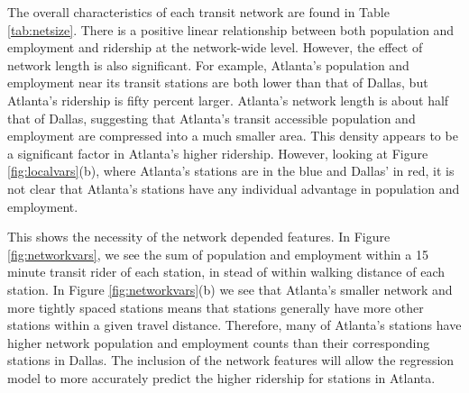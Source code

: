 \documentclass[11pt]{article}
\begin{document}
The overall characteristics of each transit network are found in Table \ref{tab:netsize}. There is a positive linear relationship between both population and employment and ridership at the network-wide level. However, the effect of network length is also significant. For example, Atlanta's population and employment near its transit stations are both lower than that of Dallas, but Atlanta's ridership is fifty percent larger. Atlanta's network length is about half that of Dallas, suggesting that Atlanta's transit accessible population and employment are compressed into a much smaller area. This density appears to be a significant factor in Atlanta's higher ridership. However, looking at Figure \ref{fig:localvars}(b), where Atlanta's stations are in the blue and Dallas' in red, it is not clear that Atlanta's stations have any individual advantage in population and employment. 

This shows the necessity of the network depended features. In Figure \ref{fig:networkvars}, we see the sum of population and employment within a 15 minute transit rider of each station, in stead of within walking distance of each station. In Figure \ref{fig:networkvars}(b) we see that Atlanta's smaller network and more tightly spaced stations means that stations generally have more other stations within a given travel distance. Therefore, many of Atlanta's stations have higher network population and employment counts than their corresponding stations in Dallas. The inclusion of the network features will allow the regression model to more accurately predict the higher ridership for stations in Atlanta. 
\end{document}
